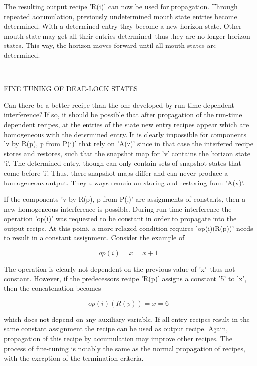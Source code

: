 \documentclass[12pt]{article}
\begin{document}
The resulting output recipe 'R(i)' can now be used for propagation. Through
repeated accumulation, previously undetermined mouth state entries become
determined. With a determined entry they become a new horizon state. Other
mouth state may get all their entries determined--thus they are no longer
horizon states. This way, the horizon moves forward until all mouth states are
determined. 

-------------------------------------------------------------------------------

FINE TUNING OF DEAD-LOCK STATES

Can there be a better recipe than the one developed by run-time dependent
interference? If so, it should be possible that after propagation of the
run-time dependent recipes, at the entries of the state new entry recipes
appear which are homogeneous with the determined entry. It is clearly
impossible for components 'v by R(p), p from P(i)' that rely on 'A(v)' since in
that case the interfered recipe stores and restores, such that the snapshot map
for 'v' contains the horizon state 'i'. The determined entry, though can only
contain sets of snapshot states that come before 'i'. Thus, there snapshot maps
differ and can never produce a homogeneous output. They always remain on
storing and restoring from 'A(v)'.

If the components 'v by R(p), p from P(i)' are assignments of constants, then a
new homogeneous interference is possible. During run-time interference the 
operation 'op(i)' was requested to be constant in order to propagate into the
output recipe. At this point, a more relaxed condition requires 'op(i)(R(p))'
needs to result in a constant assignment. Consider the example of 

\[
                       op(i) = { x = x + 1 }
\]

The operation is clearly not dependent on the previous value of 'x'--thus not
constant. However, if the predecessors recipe 'R(p)' assigns a constant '5' to
'x', then the concatenation becomes

\[
                       op(i)(R(p)) = { x = 6 }
\]

which does not depend on any auxiliary variable. If all entry recipes result in
the same constant assignment the recipe can be used as output recipe. Again,
propagation of this recipe by accumulation may improve other recipes. The process
of fine-tuning is notably the same as the normal propagation of recipes, with 
the exception of the termination criteria.
\end{document}
